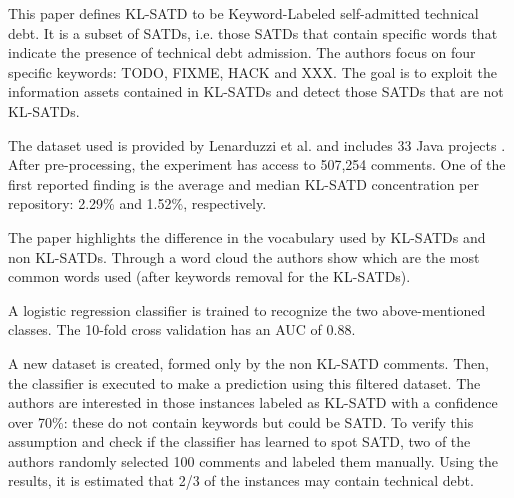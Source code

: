 This paper defines KL-SATD to be Keyword-Labeled self-admitted technical debt. It is a subset of SATDs, i.e. those SATDs that contain specific words that indicate the presence of technical debt admission. The authors focus on four specific keywords: TODO, FIXME, HACK and XXX. The goal is to exploit the information assets contained in KL-SATDs and detect those SATDs that are not KL-SATDs.

The dataset used is provided by Lenarduzzi et al. and includes 33 Java projects \cite{lenarduzzi2019technical}. After pre-processing, the experiment has access to 507,254 comments. One of the first reported finding is the average and median KL-SATD concentration per repository: 2.29\% and 1.52\%, respectively.

The paper highlights the difference in the vocabulary used by KL-SATDs and non KL-SATDs. Through a word cloud the authors show which are the most common words used (after keywords removal for the KL-SATDs).

A logistic regression classifier is trained to recognize the two above-mentioned classes. The 10-fold cross validation has an AUC of 0.88. 


A new dataset is created, formed only by the non KL-SATD comments. Then, the  classifier is executed to make a prediction using this filtered dataset. The authors are interested in those instances labeled as KL-SATD with a confidence over 70\%: these do not contain keywords but could be SATD. To verify this assumption and check if the classifier has learned to spot SATD, two of the authors randomly selected 100 comments and labeled them manually. Using the results, it is estimated that 2/3 of the instances may contain technical debt.








